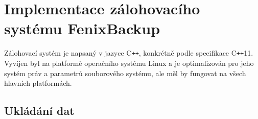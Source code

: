\chapter{Implementace zálohovacího systému FenixBackup}

Zálohovací systém je napsaný v jazyce C{\tt++}, konkrétně podle specifikace
C{\tt++}11. Vyvíjen byl na platformě operačního systému Linux a je optimalizován
pro jeho systém práv a parametrů souborového systému, ale měl by fungovat na
všech hlavních platformách.

\section{Ukládání dat}
